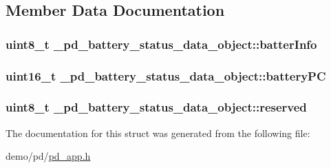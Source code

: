 \subsection{Member Data Documentation}
\hypertarget{struct__pd__battery__status__data__object_a32d8fab9c01317f358ad5b2fe32c48e7}{
\subsubsection[{batter\-Info}]{\setlength{\rightskip}{0pt plus 5cm}uint8\-\_\-t \-\_\-pd\-\_\-battery\-\_\-status\-\_\-data\-\_\-object\-::batter\-Info}}\label{struct__pd__battery__status__data__object_a32d8fab9c01317f358ad5b2fe32c48e7}
\hypertarget{struct__pd__battery__status__data__object_a9e8c5885cae3cd051e4f8bd18db1a9db}{
\subsubsection[{battery\-P\-C}]{\setlength{\rightskip}{0pt plus 5cm}uint16\-\_\-t \-\_\-pd\-\_\-battery\-\_\-status\-\_\-data\-\_\-object\-::battery\-P\-C}}\label{struct__pd__battery__status__data__object_a9e8c5885cae3cd051e4f8bd18db1a9db}
\hypertarget{struct__pd__battery__status__data__object_aeeed3d86e17f59048c77223df46a8348}{
\subsubsection[{reserved}]{\setlength{\rightskip}{0pt plus 5cm}uint8\-\_\-t \-\_\-pd\-\_\-battery\-\_\-status\-\_\-data\-\_\-object\-::reserved}}\label{struct__pd__battery__status__data__object_aeeed3d86e17f59048c77223df46a8348}


The documentation for this struct was generated from the following file\-:\begin{DoxyCompactItemize}
\item 
demo/pd/\hyperlink{pd__app_8h}{pd\-\_\-app.\-h}\end{DoxyCompactItemize}
